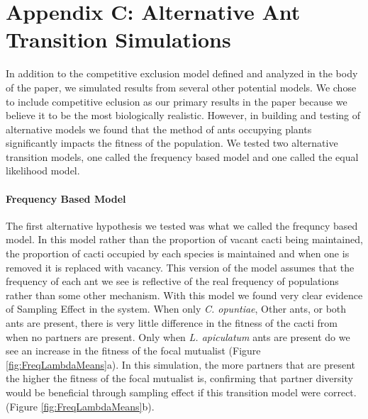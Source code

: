 \documentclass[11pt]{article}
\begin{document}
\section*{Appendix C: Alternative Ant Transition Simulations}
In addition to the competitive exclusion model defined and analyzed in the body of the paper, we simulated results from several other potential models. 
We chose to include competitive eclusion as our primary results in the paper because we believe it to be the most biologically realistic.
However, in building and testing of alternative models we found that the method of ants occupying plants significantly impacts the fitness of the population. 
We tested two alternative transition models, one called the frequency based model and one called the equal likelihood model. 

\paragraph{Frequency Based Model}
The first alternative hypothesis we tested was what we called the frequncy based model.
In this model rather than the proportion of vacant cacti being maintained, the proportion of cacti occupied by each species is maintained and when one is removed it is replaced with vacancy.
This version of the model assumes that the frequency of each ant we see is reflective of the real frequency of populations rather than some other mechanism.
With this model we found very clear evidence of Sampling Effect in the system. 
When only  \textit{C. opuntiae}, Other ants, or both ants are present, there is very little difference in the fitness of the cacti from when no partners are present. 
Only when \textit{L. apiculatum} ants are present do we see an increase in the fitness of the focal mutualist (Figure \ref{fig:FreqLambdaMeans}a).
In this simulation, the more partners that are present the higher the fitness of the focal mutualist is, confirming that partner diversity would be beneficial through sampling effect if this transition model were correct.  (Figure \ref{fig:FreqLambdaMeans}b).
\end{document}
